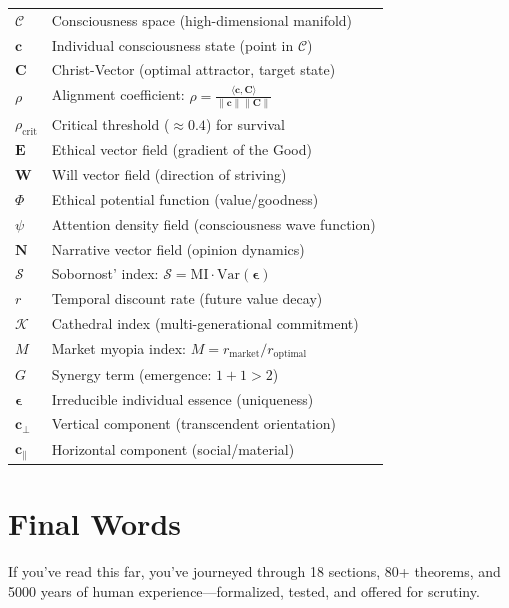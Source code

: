 \documentclass[11pt,a4paper]{article}
\theoremstyle{definition}
\theoremstyle{remark}
\newcommand{\CC}{\mathcal{C}}
\newcommand{\EE}{\mathbf{E}}
\newcommand{\WW}{\mathbf{W}}
\newcommand{\cc}{\mathbf{c}}
\begin{document}
\begin{small}
\begin{enumerate}
\begin{protocol}
\begin{tabular}{ll}
\(\CC\) & Consciousness space (high-dimensional manifold) \\
\(\cc\) & Individual consciousness state (point in \(\CC\)) \\
\(\mathbf{C}\) & Christ-Vector (optimal attractor, target state) \\
\(\rho\) & Alignment coefficient: \(\rho = \frac{\langle \cc, \mathbf{C} \rangle}{\|\cc\|\|\mathbf{C}\|}\) \\
\(\rho_{\text{crit}}\) & Critical threshold (\(\approx 0.4\)) for survival \\
\(\EE\) & Ethical vector field (gradient of the Good) \\
\(\WW\) & Will vector field (direction of striving) \\
\(\Phi\) & Ethical potential function (value/goodness) \\
\(\psi\) & Attention density field (consciousness wave function) \\
\(\mathbf{N}\) & Narrative vector field (opinion dynamics) \\
\(\mathcal{S}\) & Sobornost' index: \(\mathcal{S} = \text{MI} \cdot \text{Var}(\boldsymbol{\epsilon})\) \\
\(r\) & Temporal discount rate (future value decay) \\
\(\mathcal{K}\) & Cathedral index (multi-generational commitment) \\
\(M\) & Market myopia index: \(M = r_{\text{market}}/r_{\text{optimal}}\) \\
\(G\) & Synergy term (emergence: \(1+1>2\)) \\
\(\boldsymbol{\epsilon}\) & Irreducible individual essence (uniqueness) \\
\(\cc_\perp\) & Vertical component (transcendent orientation) \\
\(\cc_\parallel\) & Horizontal component (social/material) \\
\end{tabular}

\vspace{2em}

\section*{Final Words}

If you've read this far, you've journeyed through 18 sections, 80+ theorems, and 5000 years of human experience—formalized, tested, and offered for scrutiny.


\end{protocol}
\end{enumerate}
\end{small}
\end{document}
